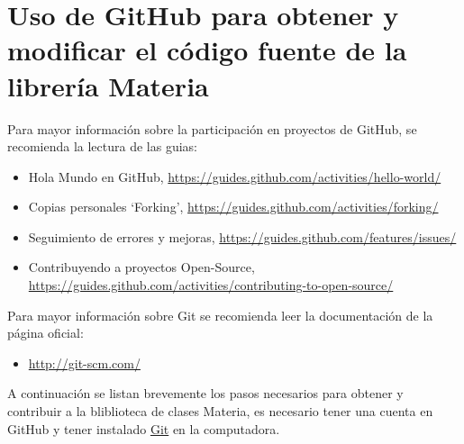 \chapter{Uso de GitHub para obtener y modificar el código fuente de la librería Materia}\label{chap:github}

Para mayor información sobre la participación en proyectos de GitHub, se recomienda la lectura de las guias:

\begin{itemize}\itemsep0ex
	\item Hola Mundo en GitHub, \url{https://guides.github.com/activities/hello-world/}
	\item Copias personales `Forking', \url{https://guides.github.com/activities/forking/}
	\item Seguimiento de errores y mejoras, \url{https://guides.github.com/features/issues/}
	\item Contribuyendo a proyectos Open-Source, \url{https://guides.github.com/activities/contributing-to-open-source/}
\end{itemize}

Para mayor información sobre Git se recomienda leer la documentación de la página oficial:
\begin{itemize}\itemsep0ex
	\item \url{http://git-scm.com/}
\end{itemize}

	A continuación se listan brevemente los pasos necesarios para obtener y contribuir a la bliblioteca de clases Materia, es necesario tener una cuenta en GitHub y tener instalado \href{http://git-scm.com/}{Git} en la computadora.

